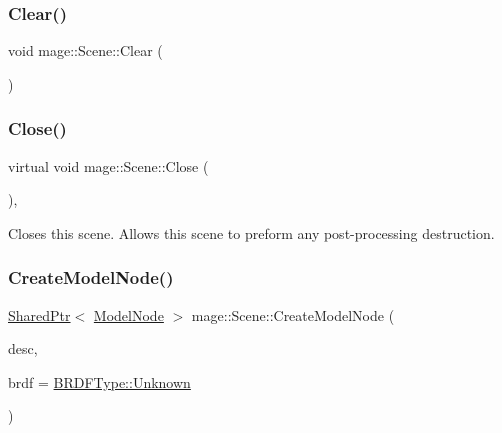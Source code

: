 \subsubsection{\texorpdfstring{Clear()}{Clear()}}
{\footnotesize\ttfamily void mage\+::\+Scene\+::\+Clear (\begin{DoxyParamCaption}{ }\end{DoxyParamCaption})\hspace{0.3cm}{\ttfamily [private]}}

\hypertarget{classmage_1_1_scene_a16786d7fcf0b813e2e94061b082cfd1d}{}\label{classmage_1_1_scene_a16786d7fcf0b813e2e94061b082cfd1d} 
\subsubsection{\texorpdfstring{Close()}{Close()}}
{\footnotesize\ttfamily virtual void mage\+::\+Scene\+::\+Close (\begin{DoxyParamCaption}{ }\end{DoxyParamCaption})\hspace{0.3cm}{\ttfamily [private]}, {\ttfamily [virtual]}}

Closes this scene. Allows this scene to preform any post-\/processing destruction. \hypertarget{classmage_1_1_scene_a5928fe1e71e816f6b13d055ee5dfa239}{}\label{classmage_1_1_scene_a5928fe1e71e816f6b13d055ee5dfa239} 
\subsubsection{\texorpdfstring{Create\+Model\+Node()}{CreateModelNode()}\hspace{0.1cm}{\footnotesize\ttfamily [1/2]}}
{\footnotesize\ttfamily \hyperlink{namespacemage_a1e01ae66713838a7a67d30e44c67703e}{Shared\+Ptr}$<$ \hyperlink{classmage_1_1_model_node}{Model\+Node} $>$ mage\+::\+Scene\+::\+Create\+Model\+Node (\begin{DoxyParamCaption}\item[{const \hyperlink{classmage_1_1_model_descriptor}{Model\+Descriptor} \&}]{desc,  }\item[{\hyperlink{namespacemage_ae7a7a03a7b34d7e2689689bb8295cd38}{B\+R\+D\+F\+Type}}]{brdf = {\ttfamily \hyperlink{namespacemage_ae7a7a03a7b34d7e2689689bb8295cd38a88183b946cc5f0e8c96b2e66e1c74a7e}{B\+R\+D\+F\+Type\+::\+Unknown}} }\end{DoxyParamCaption})}

